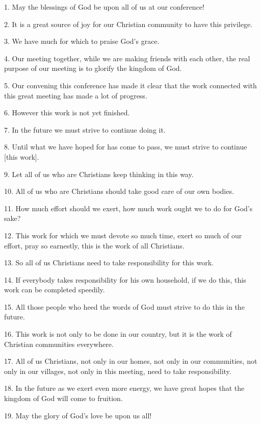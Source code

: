 \setcounter{footnote}{0}

1. May the blessings of God be upon all of us at our conference!

2. It is a great source of joy for our Christian community to have this privilege.

3. We have much for which to praise God's grace.

4. Our meeting together, while we are making friends with each other, the real purpose
of our meeting is to glorify the kingdom of God.

5. Our convening this conference has made it clear that the work connected with
this great meeting has made a lot of progress.

6. However this work is not yet finished.

7. In the future we must strive to continue doing it.

8. Until what we have hoped for has come to pass, we must strive to continue [this
work].

9. Let all of us who are Christians keep thinking in this way.

10. All of us who are Christians should take good care of our own bodies.

11. How much effort should we exert, how much work ought we to do for God's sake?

12. This work for which we must devote so much time, exert so much of our effort,
pray so earnestly, this is the work of all Christians.

13. So all of us Christians need to take responsibility for this work.

14. If everybody takes responsibility for his own household, if we do this, this
work can be completed speedily.

15. All those people who heed the words of God must strive to do this in the future.

16. This work is not only to be done in our country, but it is the work of Christian
communities everywhere.

17. All of us Christians, not only in our homes, not only in our communities, not
only in our villages, not only in this meeting, need to take responsibility.

18. In the future as we exert even more energy, we have great hopes that the kingdom
of God will come to fruition.

19. May the glory of God's love be upon us all!

